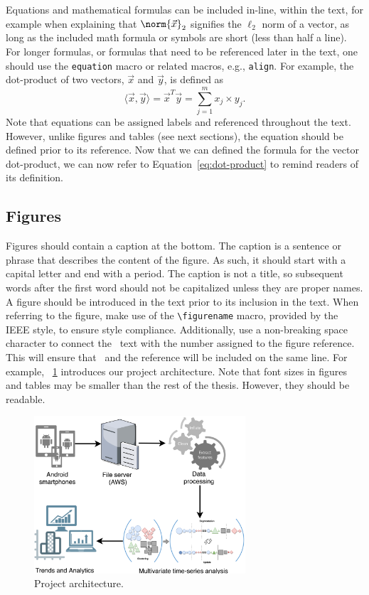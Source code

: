 Equations and mathematical formulas can be included in-line, within the text, for example when explaining that $\norm{\vec x}_2$ signifies the $\ell_2$ norm of a vector, as long as the included math formula or symbols are short (less than half a line). For longer formulas, or formulas that need to be referenced later in the text, one should use the \texttt{equation} macro or related macros, e.g., \texttt{align}. For example, the dot-product of two vectors, $\vec x$ and $\vec y$, is defined as
\begin{equation}\label{eq:dot-product}
    \langle \vec x, \vec y \rangle = \vec{x}^T\vec{y} = \sum_{j=1}^m x_j\times y_j.
\end{equation}
Note that equations can be assigned labels and referenced throughout the text. However, unlike figures and tables (see next sections), the equation should be defined prior to its reference. Now that we can defined the formula for the vector dot-product, we can now refer to Equation~\ref{eq:dot-product} to remind readers of its definition.

\subsection{Figures}\label{sec:latex:figures}

Figures should contain a caption at the bottom. The caption is a sentence or phrase that describes the content of the figure. As such, it should start with a capital letter and end with a period. The caption is not a title, so subsequent words after the first word should not be capitalized unless they are proper names. A figure should be introduced in the text prior to its inclusion in the text. When referring to the figure, make use of the  \texttt{{\textbackslash}figurename} macro, provided by the IEEE style, to ensure style compliance. Additionally, use a non-breaking space character to connect the \figurename~text with the number assigned to the figure reference. This will ensure that \figurename~and the reference will be included on the same line. For example, \figurename~\ref{fig:proj-arch} introduces our project architecture. Note that font sizes in figures and tables may be smaller than the rest of the thesis. However, they should be readable.

\begin{figure}[!htb]
  \centering
  \includegraphics[width=0.7\textwidth]{figures/proj-arch.pdf}
  \caption{Project architecture.}
  \label{fig:proj-arch}
\end{figure}


